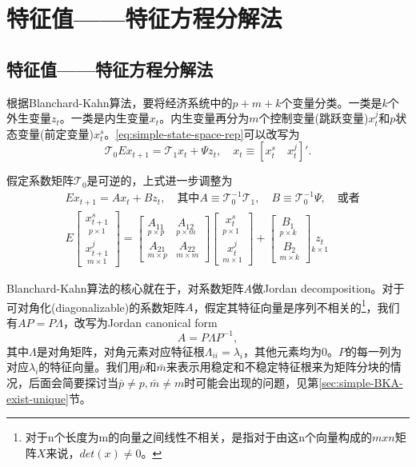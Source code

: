 \section{特征值——特征方程分解法}
\label{sec:simple-BK-algorihtm}

\subsection{特征值——特征方程分解法}
根据Blanchard-Kahn算法，要将经济系统中的$p+m+k$个变量分类。一类是$k$个外生变量$z_t$。一类是内生变量$x_t$。内生变量再分为$m$个控制变量(跳跃变量)$x_t^j$和$p$状态变量(前定变量)$x_t^s$。\eqref{eq:simple-state-space-rep}可以改写为
\begin{equation}
  \label{eq:simple-KBA-tau}
  \mathcal{T}_0 E x_{t+1} = \mathcal{T}_1 x_t + \Psi z_t, \quad x_t \equiv \left[x_t^s \quad x_t^j \right]'.
\end{equation}

假定系数矩阵$\mathcal{T}_0$是可逆的，上式进一步调整为
\begin{align}
  \label{eq:simple-BKA-matrix-AB}
    &E x_{t+1} = A x_{t} + B z_t, \quad \text{其中}
    A \equiv \mathcal{T}_0^{-1} \mathcal{T}_1, \quad B \equiv \mathcal{T}_{0}^{-1} \Psi, \quad \text{或者} \nonumber \\
    & E \begin{bmatrix}
    \underset{p \times 1}{x_{t+1}^s} \\
    \underset{m \times 1}{x_{t+1}^j}
  \end{bmatrix} = \begin{bmatrix}
  \underset{p \times p}{A_{11}} &
  \underset{p \times m}{A_{12}} \\
  \underset{m \times p}{A_{21}} &
  \underset{m \times m}{A_{22}}
  \end{bmatrix}
  \begin{bmatrix}
  \underset{p \times 1}{x_{t}^s} \\
  \underset{m \times 1}{x_{t}^j}
\end{bmatrix}
+ \begin{bmatrix}
\underset{p \times k}{B_{1}} \\
\underset{m \times k}{B_{2}}
\end{bmatrix}
\underset{k \times 1}{z_t}
\end{align}

Blanchard-Kahn算法的核心就在于，对系数矩阵$A$做Jordan decomposition。对于可对角化(diagonalizable)的系数矩阵$A$，假定其特征向量是序列不相关的\footnote{对于n个长度为m的向量之间线性不相关，是指对于由这n个向量构成的$mxn$矩阵$X$来说，$det(x) \neq 0$。}，我们有$A P = P \Lambda$，改写为Jordan canonical form
\begin{equation}
  \label{simple-BKA-jordan}
    A = P \Lambda P^{-1},
\end{equation}
其中$\Lambda$是对角矩阵，对角元素对应特征根$\Lambda_{ii} = \lambda_i$，其他元素均为$0$。$P$的每一列为对应$\lambda_i$的特征向量。我们用$\bar{p}$和$\bar{m}$来表示用稳定和不稳定特征根来为矩阵分块的情况，后面会简要探讨当$\bar{p} \neq p, \bar{m} \neq m$时可能会出现的问题，见第\ref{sec:simple-BKA-exist-unique}节。

